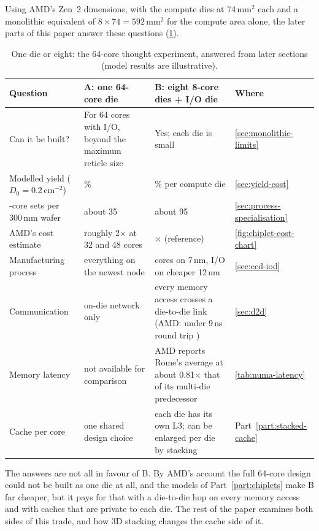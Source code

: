 Using AMD's Zen~2 dimensions, with the compute dies at 74\,mm$^2$ each and a monolithic equivalent of $8 \times 74 = 592$\,mm$^2$ for the compute area alone, the later parts of this paper answer these questions (\cref{tab:thought-experiment}).

\begin{table}[htbp]
  \centering
  \caption[One die or eight: the 64-core thought experiment, answered from later sections]{One die or eight: the 64-core thought experiment, answered from later sections (model results are illustrative).}
  \label{tab:thought-experiment}
  \small
  \begin{tabularx}{\textwidth}{@{}>{\raggedright\arraybackslash}p{3.0cm}>{\raggedright\arraybackslash}X>{\raggedright\arraybackslash}X>{\raggedright\arraybackslash}p{1.7cm}@{}}
    \toprule
    \textbf{Question} & \textbf{A: one 64-core die} & \textbf{B: eight 8-core dies + I/O die} & \textbf{Where} \\
    \midrule
    Can it be built? & For 64 cores with I/O, beyond the maximum reticle size \cite{naffziger2020chiplet} & Yes; each die is small & \cref{sec:monolithic-limits} \\
    Modelled yield ($D_0 = 0.2$\,cm$^{-2}$) & 38\% & 87\% per compute die & \cref{sec:yield-cost} \\
    64-core sets per 300\,mm wafer & about 35 & about 95 & \cref{sec:process-specialisation} \\
    AMD's cost estimate & roughly 2$\times$ at 32 and 48 cores & 1$\times$ (reference) & \cref{fig:chiplet-cost-chart} \\
    Manufacturing process & everything on the newest node & cores on 7\,nm, I/O on cheaper 12\,nm & \cref{sec:ccd-iod} \\
    Communication & on-die network only & every memory access crosses a die-to-die link (AMD: under 9\,ns round trip \cite{naffziger2020chiplet}) & \cref{sec:d2d} \\
    Memory latency & not available for comparison & AMD reports Rome's average at about 0.81$\times$ that of its multi-die predecessor \cite{naffziger2020chiplet} & \cref{tab:numa-latency} \\
    Cache per core & one shared design choice & each die has its own L3; can be enlarged per die by stacking & Part~\ref{part:stacked-cache} \\
    \bottomrule
  \end{tabularx}
\end{table}

The answers are not all in favour of B. By AMD's account the full 64-core design could not be built as one die at all, and the models of Part~\ref{part:chiplets} make B far cheaper, but it pays for that with a die-to-die hop on every memory access and with caches that are private to each die. The rest of the paper examines both sides of this trade, and how 3D stacking changes the cache side of it.

